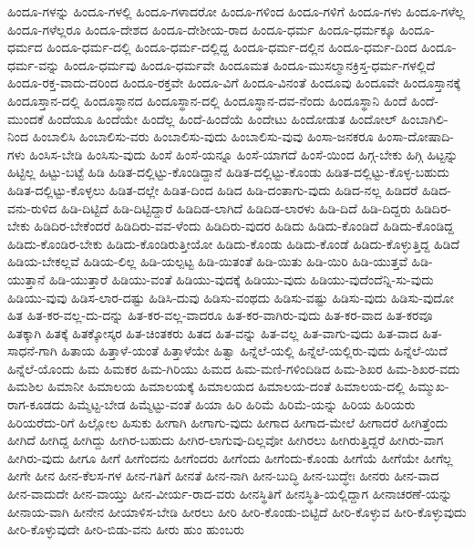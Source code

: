 {ಹಿಂದೂ-ಗಳನ್ನು
ಹಿಂದೂ-ಗಳಲ್ಲಿ
ಹಿಂದೂ-ಗಳಾದರೋ
ಹಿಂದೂ-ಗಳಿಂದ
ಹಿಂದೂ-ಗಳಿಗೆ
ಹಿಂದೂ-ಗಳು
ಹಿಂದೂ-ಗಳೆಲ್ಲ
ಹಿಂದೂ-ಗಳೆಲ್ಲರೂ
ಹಿಂದೂ-ದೇಶದ
ಹಿಂದೂ-ದೇಶೀಯ-ರಾದ
ಹಿಂದೂ-ಧರ್ಮ
ಹಿಂದೂ-ಧರ್ಮಕ್ಕೂ
ಹಿಂದೂ-ಧರ್ಮದ
ಹಿಂದೂ-ಧರ್ಮ-ದಲ್ಲಿ
ಹಿಂದೂ-ಧರ್ಮ-ದಲ್ಲಿದ್ದ
ಹಿಂದೂ-ಧರ್ಮ-ದಲ್ಲಿನ
ಹಿಂದೂ-ಧರ್ಮ-ದಿಂದ
ಹಿಂದೂ-ಧರ್ಮ-ವನ್ನು
ಹಿಂದೂ-ಧರ್ಮವು
ಹಿಂದೂ-ಧರ್ಮವೇ
ಹಿಂದೂಮತ
ಹಿಂದೂ-ಮುಸಲ್ಮಾನಕ್ರಿಸ್ತ-ಧರ್ಮ-ಗಳಲ್ಲಿದೆ
ಹಿಂದೂ-ರಕ್ತ-ವಾದು-ದರಿಂದ
ಹಿಂದೂ-ರಕ್ತವೇ
ಹಿಂದೂ-ವಿಗೆ
ಹಿಂದೂ-ವಿನಂತೆ
ಹಿಂದೂವು
ಹಿಂದೂವೇ
ಹಿಂದೂಸ್ತಾನಕ್ಕೆ
ಹಿಂದೂಸ್ತಾನ-ದಲ್ಲಿ
ಹಿಂದೂಸ್ಥಾನದ
ಹಿಂದೂಸ್ಥಾನ-ದಲ್ಲಿ
ಹಿಂದೂಸ್ಥಾನ-ದವ-ನೆಂದು
ಹಿಂದೂಸ್ಥಾನಿ
ಹಿಂದೆ
ಹಿಂದೆ-ಮುಂದಕೆ
ಹಿಂದೆಯೂ
ಹಿಂದೆಯೇ
ಹಿಂದೆಲ್ಲ
ಹಿಂದೆ-ಹಿಂದೆಯೆ
ಹಿಂದೇಟು
ಹಿಂದೋಡುತ
ಹಿಂದೋಲ್
ಹಿಂಬಾಗಿಲಿ-ನಿಂದ
ಹಿಂಬಾಲಿಸಿ
ಹಿಂಬಾಲಿಸು-ವರು
ಹಿಂಬಾಲಿಸು-ವುದು
ಹಿಂಬಾಲಿಸು-ವುವು
ಹಿಂಸಾ-ಜನಕರೂ
ಹಿಂಸಾ-ದೋಷಾದಿ-ಗಳು
ಹಿಂಸಿಸ-ಬೇಡಿ
ಹಿಂಸಿಸು-ವುದು
ಹಿಂಸೆ
ಹಿಂಸೆ-ಯನ್ನೂ
ಹಿಂಸೆ-ಯಾಗದೆ
ಹಿಂಸೆ-ಯಿಂದ
ಹಿಗ್ಗ-ಬೇಕು
ಹಿಗ್ಗಿ
ಹಿಟ್ಟನ್ನು
ಹಿಟ್ಟಿಲ್ಲ
ಹಿಟ್ಟು-ಬಟ್ಟೆ
ಹಿಡಿ
ಹಿಡಿತ-ದಲ್ಲಿಟ್ಟು-ಕೊಂಡಿದ್ದಾನೆ
ಹಿಡಿತ-ದಲ್ಲಿಟ್ಟು-ಕೊಂಡು
ಹಿಡಿತ-ದಲ್ಲಿಟ್ಟು-ಕೊಳ್ಳ-ಬಹುದು
ಹಿಡಿತ-ದಲ್ಲಿಟ್ಟು-ಕೊಳ್ಳಲು
ಹಿಡಿತ-ದಲ್ಲೇ
ಹಿಡಿತ-ದಿಂದ
ಹಿಡಿದ
ಹಿಡಿ-ದಂತಾಗು-ವುದು
ಹಿಡಿದ-ನಲ್ಲ
ಹಿಡಿದರೆ
ಹಿಡಿದ-ವನು-ರುಳಿದ
ಹಿಡಿ-ದಿಟ್ಟಿದೆ
ಹಿಡಿ-ದಿಟ್ಟಿದ್ದಾರೆ
ಹಿಡಿದಿಡ-ಲಾಗಿದೆ
ಹಿಡಿದಿಡ-ಲಾರಳು
ಹಿಡಿ-ದಿದೆ
ಹಿಡಿ-ದಿದ್ದರು
ಹಿಡಿದಿರ-ಬೇಕು
ಹಿಡಿದಿರ-ಬೇಕೆಂದರೆ
ಹಿಡಿದಿರು-ವವ-ಳೆಂದು
ಹಿಡಿದಿರು-ವುದರ
ಹಿಡಿದು
ಹಿಡಿದು-ಕೊಂಡಿದೆ
ಹಿಡಿದು-ಕೊಂಡಿದ್ದ
ಹಿಡಿದು-ಕೊಂಡಿರ-ಬೇಕು
ಹಿಡಿದು-ಕೊಂಡಿರುತ್ತೀಯೋ
ಹಿಡಿದು-ಕೊಂಡು
ಹಿಡಿದು-ಕೊಂಡೆ
ಹಿಡಿದು-ಕೊಳ್ಳುತ್ತಿದ್ದ
ಹಿಡಿದೆ
ಹಿಡಿಯ-ಬೇಕಲ್ಲವೆ
ಹಿಡಿಯ-ಲಿಲ್ಲ
ಹಿಡಿ-ಯಲ್ಪಟ್ಟ
ಹಿಡಿ-ಯಿತಂತೆ
ಹಿಡಿ-ಯಿತು
ಹಿಡಿ-ಯಿರಿ
ಹಿಡಿ-ಯುತ್ತವೆ
ಹಿಡಿ-ಯುತ್ತಾನೆ
ಹಿಡಿ-ಯುತ್ತಾರೆ
ಹಿಡಿಯು-ವಂತೆ
ಹಿಡಿಯು-ವುದಕ್ಕೆ
ಹಿಡಿಯು-ವುದು
ಹಿಡಿಯು-ವುದೆಂದೆನ್ನಿ-ಸು-ವುದು
ಹಿಡಿಯು-ವುವು
ಹಿಡಿಸ-ಲಾರ-ದಷ್ಟು
ಹಿಡಿಸಿ-ದುವು
ಹಿಡಿಸು-ವಂಥದು
ಹಿಡಿಸು-ವಷ್ಟು
ಹಿಡಿಸು-ವುದು
ಹಿಡಿಸು-ವುದೋ
ಹಿತ
ಹಿತ-ಕರ-ವಲ್ಲ-ದು-ದನ್ನು
ಹಿತ-ಕರ-ವಲ್ಲ-ವಾದರೂ
ಹಿತ-ಕರ-ವಾಗಿರು-ವುದು
ಹಿತ-ಕರ-ವಾದ
ಹಿತ-ಕರವೂ
ಹಿತಕ್ಕಾಗಿ
ಹಿತಕ್ಕೆ
ಹಿತಕ್ಕೋಸ್ಕರ
ಹಿತ-ಚಿಂತಕರು
ಹಿತದ
ಹಿತ-ವನ್ನು
ಹಿತ-ವಲ್ಲ
ಹಿತ-ವಾಗು-ವುದು
ಹಿತ-ವಾದ
ಹಿತ-ಸಾಧನೆ-ಗಾಗಿ
ಹಿತಾಯ
ಹಿತ್ತಾಳೆ-ಯಂತೆ
ಹಿತ್ತಾಳೆಯೇ
ಹಿತ್ವಾ
ಹಿನ್ನೆಲೆ-ಯಲ್ಲಿ
ಹಿನ್ನೆಲೆ-ಯಲ್ಲಿರು-ವುದು
ಹಿನ್ನೆಲೆ-ಯಿದೆ
ಹಿನ್ನೆಲೆ-ಯೊಂದು
ಹಿಮ
ಹಿಮಕರ
ಹಿಮ-ಗಿರಿಯು
ಹಿಮದ
ಹಿಮ-ಮಣಿ-ಗಳಿಂದಿಡಿದ
ಹಿಮ-ಶಿಖರ
ಹಿಮ-ಶಿಖರ-ವದು
ಹಿಮಶಿಲ
ಹಿಮಾನೀ
ಹಿಮಾಲಯ
ಹಿಮಾಲಯಕ್ಕೆ
ಹಿಮಾಲಯದ
ಹಿಮಾಲಯ-ದಂತೆ
ಹಿಮಾಲಯ-ದಲ್ಲಿ
ಹಿಮ್ಮುಖ-ರಾಗ-ಕೂಡದು
ಹಿಮ್ಮೆಟ್ಟ-ಬೇಡ
ಹಿಮ್ಮೆಟ್ಟು-ವಂತೆ
ಹಿಯಾ
ಹಿರಿ
ಹಿರಿಮೆ
ಹಿರಿಮೆ-ಯನ್ನು
ಹಿರಿಯ
ಹಿರಿಯರು
ಹಿರಿಯರೆದು-ರಿಗೆ
ಹಿಲ್ಲೋಲ
ಹಿಸುಕು
ಹೀಗಾಗಿ
ಹೀಗಾಗು-ವುದು
ಹೀಗಾದ
ಹೀಗಾದ-ಮೇಲೆ
ಹೀಗಾದರೆ
ಹೀಗಿತ್ತೆಂದು
ಹೀಗಿದೆ
ಹೀಗಿದ್ದ
ಹೀಗಿದ್ದು
ಹೀಗಿರ-ಬಹುದು
ಹೀಗಿರ-ಲಾಗುವು-ದಿಲ್ಲವೋ
ಹೀಗಿರಲು
ಹೀಗಿರುತ್ತಿದ್ದರೆ
ಹೀಗಿರು-ವಾಗ
ಹೀಗಿರು-ವುದು
ಹೀಗೂ
ಹೀಗೆ
ಹೀಗೆಂದನು
ಹೀಗೆಂದರು
ಹೀಗೆಂದು
ಹೀಗೆಂದು-ಕೊಂಡು
ಹೀಗೆಯೆ
ಹೀಗೆಯೇ
ಹೀಗೆಲ್ಲ
ಹೀಗೇ
ಹೀನ
ಹೀನ-ಕೆಲಸ-ಗಳ
ಹೀನ-ಗತಿಗೆ
ಹೀನತೆ
ಹೀನ-ನಾಗಿ
ಹೀನ-ಬುದ್ಧಿ
ಹೀನ-ಬುದ್ಧೇಃ
ಹೀನರು
ಹೀನ-ವಾದ
ಹೀನ-ವಾದುದೇ
ಹೀನ-ವಾಯ್ತು
ಹೀನ-ವೀರ್ಯ-ರಾದ-ವರು
ಹೀನಸ್ಥಿತಿಗೆ
ಹೀನಸ್ಥಿತಿ-ಯಲ್ಲಿದ್ದಾಗ
ಹೀನಾಚರಣೆ-ಯನ್ನು
ಹೀನಾಯ-ವಾಗಿ
ಹೀನೇನ
ಹೀಯಾಳಿಸ-ಬೇಡಿ
ಹೀರಲು
ಹೀರಿ
ಹೀರಿ-ಕೊಂಡು-ಬಿಟ್ಟಿದೆ
ಹೀರಿ-ಕೊಳ್ಳುವ
ಹೀರಿ-ಕೊಳ್ಳುವುದು
ಹೀರಿ-ಕೊಳ್ಳುವುದೇ
ಹೀರಿ-ಬಿಡು-ವನು
ಹೀರು
ಹುಂ
ಹುಂಬರು
}
